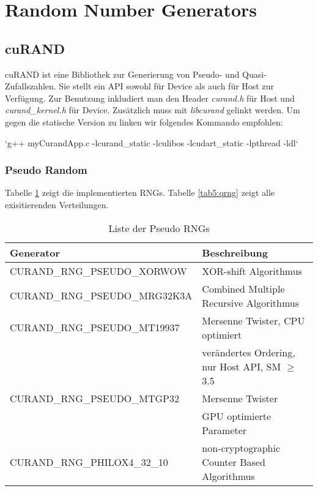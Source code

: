 	\section{Random Number Generators}
		\subsection{cuRAND}
		cuRAND ist eine Bibliothek zur Generierung von Pseudo- und Quasi-Zufallszahlen. Sie stellt ein \Gls{API} sowohl für Device als auch für Host zur Verfügung. Zur Benutzung inkludiert man den Header \textit{curand.h} für Host und \textit{curand{\_}kernel.h} für Device. Zusätzlich muss mit \textit{libcurand} gelinkt werden. Um gegen die statische Version zu linken wir folgendes Kommando empfohlen: 
		
		\li`g++ myCurandApp.c -lcurand_static -lculibos -lcudart_static -lpthread -ldl`
		
			\subsubsection{Pseudo Random}
			Tabelle \ref{tab5:prng} zeigt die implementierten RNGs. Tabelle \ref{tab5:qrng} zeigt alle exisitierenden Verteilungen.
			\begin{table}[h]
			\centering
			\begin{tabular}{|l|l|}
				\hline
				\textbf{Generator} & \textbf{Beschreibung} \\ \hline\hline
				CURAND{\_}RNG{\_}PSEUDO{\_}XORWOW    & XOR-shift Algorithmus \\ \hline
				CURAND{\_}RNG{\_}PSEUDO{\_}MRG32K3A  & Combined Multiple Recursive Algorithmus \\ \hline
				CURAND{\_}RNG{\_}PSEUDO{\_}MT19937   & Mersenne Twister, CPU optimiert \\
				                                     & verändertes Ordering, nur Host API, SM $\geq$ 3.5 \\ \hline
				CURAND{\_}RNG{\_}PSEUDO{\_}MTGP32    & Mersenne Twister \\
				                                     & GPU optimierte Parameter \\ \hline
				CURAND{\_}RNG{\_}PHILOX4{\_}32{\_}10 & non-cryptographic Counter Based Algorithmus \\ \hline\bottomrule
			\end{tabular}
			\caption{Liste der Pseudo RNGs}
			\label{tab5:prng}
			\end{table}
			
